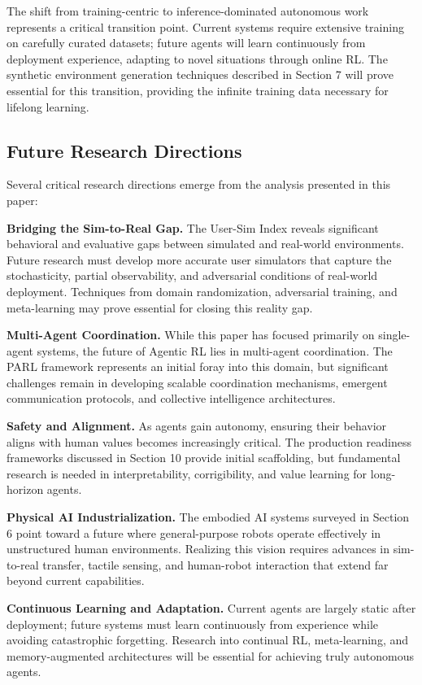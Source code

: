 The shift from training-centric to inference-dominated autonomous work represents a critical transition point. Current systems require extensive training on carefully curated datasets; future agents will learn continuously from deployment experience, adapting to novel situations through online RL. The synthetic environment generation techniques described in Section 7 will prove essential for this transition, providing the infinite training data necessary for lifelong learning.

\subsection{Future Research Directions}

Several critical research directions emerge from the analysis presented in this paper:

\textbf{Bridging the Sim-to-Real Gap.} The User-Sim Index reveals significant behavioral and evaluative gaps between simulated and real-world environments. Future research must develop more accurate user simulators that capture the stochasticity, partial observability, and adversarial conditions of real-world deployment. Techniques from domain randomization, adversarial training, and meta-learning may prove essential for closing this reality gap.

\textbf{Multi-Agent Coordination.} While this paper has focused primarily on single-agent systems, the future of Agentic RL lies in multi-agent coordination. The PARL framework represents an initial foray into this domain, but significant challenges remain in developing scalable coordination mechanisms, emergent communication protocols, and collective intelligence architectures.

\textbf{Safety and Alignment.} As agents gain autonomy, ensuring their behavior aligns with human values becomes increasingly critical. The production readiness frameworks discussed in Section 10 provide initial scaffolding, but fundamental research is needed in interpretability, corrigibility, and value learning for long-horizon agents.

\textbf{Physical AI Industrialization.} The embodied AI systems surveyed in Section 6 point toward a future where general-purpose robots operate effectively in unstructured human environments. Realizing this vision requires advances in sim-to-real transfer, tactile sensing, and human-robot interaction that extend far beyond current capabilities.

\textbf{Continuous Learning and Adaptation.} Current agents are largely static after deployment; future systems must learn continuously from experience while avoiding catastrophic forgetting. Research into continual RL, meta-learning, and memory-augmented architectures will be essential for achieving truly autonomous agents.

